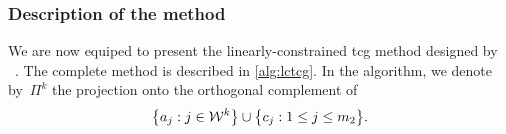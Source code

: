 \subsubsection{Description of the  method}

We are now equiped to present the linearly-constrained \gls{tcg} method designed by \citeauthor{Powell_2015}~\cite{Powell_2015}.
The complete method is described in \cref{alg:lctcg}.
In the algorithm, we denote by~$\Pi^k$ the projection onto the orthogonal complement of
\begin{equation*}
    \set[\big]{a_j : j \in \mathcal{W}^k} \cup \set[\big]{c_j : 1 \le j \le m_2}.
\end{equation*}

